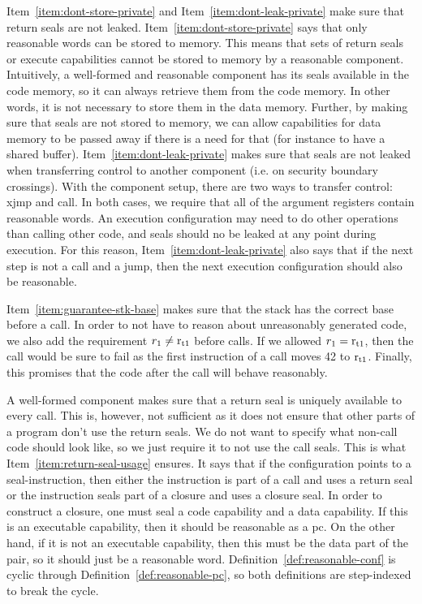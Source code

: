 \documentclass{jfp}
\newenvironment{jversion}{}{}
\begin{document}
\begin{jversion}
Item~\ref{item:dont-store-private} and Item~\ref{item:dont-leak-private} make sure that return seals are not leaked.
Item~\ref{item:dont-store-private} says that only reasonable words can be stored to memory.
This means that sets of return seals or execute capabilities cannot be stored to memory by a reasonable component.
Intuitively, a well-formed and reasonable component has its seals available in the code memory, so it can always retrieve them from the code memory.
In other words, it is not necessary to store them in the data memory.
Further, by making sure that seals are not stored to memory, we can allow capabilities for data memory to be passed away if there is a need for that (for instance to have a shared buffer).
Item~\ref{item:dont-leak-private} makes sure that seals are not leaked when transferring control to another component (i.e. on security boundary crossings).
With the component setup, there are two ways to transfer control: xjmp and call.
In both cases, we require that all of the argument registers contain reasonable words.
An execution configuration may need to do other operations than calling other code, and seals should no be leaked at any point during execution.
For this reason, Item~\ref{item:dont-leak-private} also says that if the next step is not a call and a jump, then the next execution configuration should also be reasonable.

Item~\ref{item:guarantee-stk-base} makes sure that the stack has the correct base before a call.
In order to not have to reason about unreasonably generated code, we also add the requirement $r_1 \neq \mathrm{r}_\mathrm{t1}$ before calls.
If we allowed $r_1=\mathrm{r}_\mathrm{t1}$, then the call would be sure to fail as the first instruction of a call moves 42 to $\mathrm{r}_\mathrm{t1}$.
Finally, this promises that the code after the call will behave reasonably.

A well-formed component makes sure that a return seal is uniquely available to every call.
This is, however, not sufficient as it does not ensure that other parts of a program don't use the return seals.
We do not want to specify what non-call code should look like, so we just require it to not use the call seals.
This is what Item~\ref{item:return-seal-usage} ensures.
It says that if the configuration points to a seal-instruction, then either the instruction is part of a call and uses a return seal or the instruction seals part of a closure and uses a closure seal.
In order to construct a closure, one must seal a code capability and a data capability.
If this is an executable capability, then it should be reasonable as a pc.
On the other hand, if it is not an executable capability, then this must be the data part of the pair, so it should just be a reasonable word.
Definition~\ref{def:reasonable-conf} is cyclic through Definition~\ref{def:reasonable-pc}, so both definitions are step-indexed to break the cycle.


\end{jversion}
\end{document}
